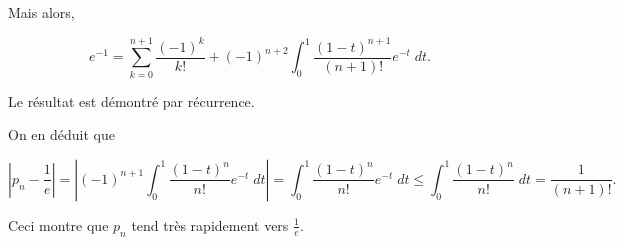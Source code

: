 {\begin{enumerate}
{Mais alors,

$$e^{-1}=\sum_{k=0}^{n+1}\frac{(-1)^k}{k!}+(-1)^{n+2}\int_{0}^{1}\frac{(1-t)^{n+1}}{(n+1)!}e^{-t}\;dt.$$

Le résultat est démontré par récurrence.

On en déduit que

$$|p_n-\frac{1}{e}|=\left|(-1)^{n+1}\int_{0}^{1}\frac{(1-t)^n}{n!}e^{-t}\;dt\right|
=\int_{0}^{1}\frac{(1-t)^n}{n!}e^{-t}\;dt\leq\int_{0}^{1}\frac{(1-t)^n}{n!}\;dt=\frac{1}{(n+1)!}.$$

Ceci montre que $p_n$ tend très rapidement vers $\frac{1}{e}$.}
\end{enumerate}
}

